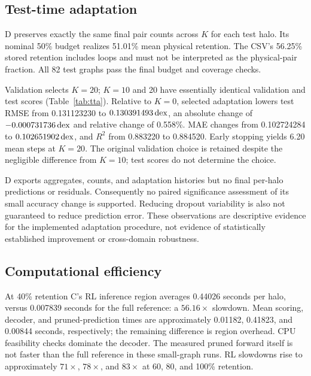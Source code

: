 \subsection{Test-time adaptation}
\label{sec:tta}
D preserves exactly the same final pair counts across $K$ for each test halo. Its nominal 50\% budget realizes 51.01\% mean physical retention. The CSV's 56.25\% stored retention includes loops and must not be interpreted as the physical-pair fraction. All 82 test graphs pass the final budget and coverage checks.

\begin{table}[t]
\centering\small
\caption{D adaptation at a separate requested 50\% pair budget. RMSE is in dex. $K$ is a maximum; early stopping reduces actual steps. $K=20$ was selected using validation only. Nine decimals expose the near-tie between $K=10$ and 20 and are not a claim of measurement precision.}
\label{tab:tta}

\end{table}

Validation selects $K=20$; $K=10$ and 20 have essentially identical validation and test scores (Table~\ref{tab:tta}). Relative to $K=0$, selected adaptation lowers test RMSE from 0.131123230 to $0.130391493\,\mathrm{dex}$, an absolute change of $-0.000731736\,\mathrm{dex}$ and relative change of 0.558\%. MAE changes from 0.102724284 to $0.102651902\,\mathrm{dex}$, and $R^2$ from 0.883220 to 0.884520. Early stopping yields 6.20 mean steps at $K=20$. The original validation choice is retained despite the negligible difference from $K=10$; test scores do not determine the choice.

D exports aggregates, counts, and adaptation histories but no final per-halo predictions or residuals. Consequently no paired significance assessment of its small accuracy change is supported. Reducing dropout variability is also not guaranteed to reduce prediction error. These observations are descriptive evidence for the implemented adaptation procedure, not evidence of statistically established improvement or cross-domain robustness.

\subsection{Computational efficiency}
\label{sec:efficiency}
At 40\% retention C's RL inference region averages 0.44026 seconds per halo, versus 0.007839 seconds for the full reference: a $56.16\times$ slowdown. Mean scoring, decoder, and pruned-prediction times are approximately 0.01182, 0.41823, and 0.00844 seconds, respectively; the remaining difference is region overhead. CPU feasibility checks dominate the decoder. The measured pruned forward itself is not faster than the full reference in these small-graph runs. RL slowdowns rise to approximately $71\times$, $78\times$, and $83\times$ at 60, 80, and 100\% retention.

